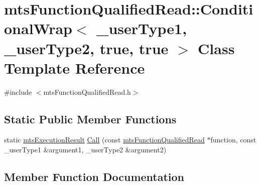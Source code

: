 \hypertarget{classmts_function_qualified_read_1_1_conditional_wrap_3_01__user_type1_00_01__user_type2_00_01true_00_01true_01_4}{}\section{mts\+Function\+Qualified\+Read\+:\+:Conditional\+Wrap$<$ \+\_\+user\+Type1, \+\_\+user\+Type2, true, true $>$ Class Template Reference}
\label{classmts_function_qualified_read_1_1_conditional_wrap_3_01__user_type1_00_01__user_type2_00_01true_00_01true_01_4}


{\ttfamily \#include $<$mts\+Function\+Qualified\+Read.\+h$>$}

\subsection*{Static Public Member Functions}
\begin{DoxyCompactItemize}
\item 
static \hyperlink{classmts_execution_result}{mts\+Execution\+Result} \hyperlink{classmts_function_qualified_read_1_1_conditional_wrap_3_01__user_type1_00_01__user_type2_00_01true_00_01true_01_4_adb108f5a3fbe7002fe2f7c320361a184}{Call} (const \hyperlink{classmts_function_qualified_read}{mts\+Function\+Qualified\+Read} $\ast$function, const \+\_\+user\+Type1 \&argument1, \+\_\+user\+Type2 \&argument2)
\end{DoxyCompactItemize}


\subsection{Member Function Documentation}
\hypertarget{classmts_function_qualified_read_1_1_conditional_wrap_3_01__user_type1_00_01__user_type2_00_01true_00_01true_01_4_adb108f5a3fbe7002fe2f7c320361a184}{}
